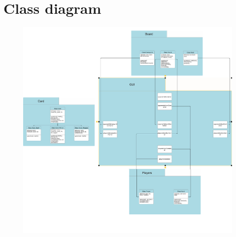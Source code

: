 \documentclass[12pt,a4paper]{article}
\begin{document}
\section{Class diagram}
\begin{figure}[h]
\centering 
\includegraphics[width=1\textwidth]{img/Diagram.jpg}
\end{figure}
\end{document}
